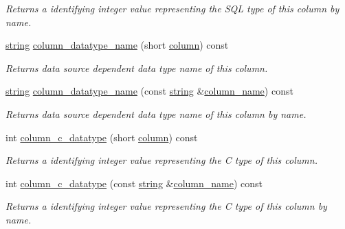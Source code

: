 \begin{DoxyCompactItemize}
\begin{DoxyCompactList}\small\item\em Returns a identifying integer value representing the S\+QL type of this column by name. \end{DoxyCompactList}\item 
\mbox{\hyperlink{namespacenanodbc_abfc0ece56278e590911ec8352774c212}{string}} \mbox{\hyperlink{classnanodbc_1_1result_a72775ba759833560efebba44892576b3}{column\+\_\+datatype\+\_\+name}} (short \mbox{\hyperlink{classnanodbc_1_1result_ae4e254b2db63c65473cc058de3d5a844}{column}}) const
\begin{DoxyCompactList}\small\item\em Returns data source dependent data type name of this column. \end{DoxyCompactList}\item 
\mbox{\hyperlink{namespacenanodbc_abfc0ece56278e590911ec8352774c212}{string}} \mbox{\hyperlink{classnanodbc_1_1result_a391d792c4a37be4037274b681c96da59}{column\+\_\+datatype\+\_\+name}} (const \mbox{\hyperlink{namespacenanodbc_abfc0ece56278e590911ec8352774c212}{string}} \&\mbox{\hyperlink{classnanodbc_1_1result_a2bd3fc4e416108960c4191b2cbba256b}{column\+\_\+name}}) const
\begin{DoxyCompactList}\small\item\em Returns data source dependent data type name of this column by name. \end{DoxyCompactList}\item 
int \mbox{\hyperlink{classnanodbc_1_1result_a094ee5a13d83c0aeabd8ccab4c4e130c}{column\+\_\+c\+\_\+datatype}} (short \mbox{\hyperlink{classnanodbc_1_1result_ae4e254b2db63c65473cc058de3d5a844}{column}}) const
\begin{DoxyCompactList}\small\item\em Returns a identifying integer value representing the C type of this column. \end{DoxyCompactList}\item 
int \mbox{\hyperlink{classnanodbc_1_1result_a3f505031acffabc538b2d840416074fa}{column\+\_\+c\+\_\+datatype}} (const \mbox{\hyperlink{namespacenanodbc_abfc0ece56278e590911ec8352774c212}{string}} \&\mbox{\hyperlink{classnanodbc_1_1result_a2bd3fc4e416108960c4191b2cbba256b}{column\+\_\+name}}) const
\begin{DoxyCompactList}\small\item\em Returns a identifying integer value representing the C type of this column by name. \end{DoxyCompactList}\item 

\end{DoxyCompactItemize}
